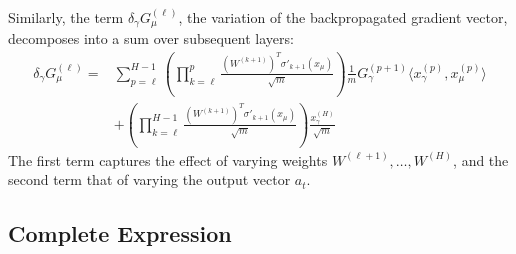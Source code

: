 \documentclass[11pt,a4paper]{article}
\theoremstyle{definition}
\begin{document}
Similarly, the term $\delta_\gamma G^{(\ell)}_\mu$, the variation of the backpropagated gradient vector, decomposes into a sum over subsequent layers:
\begin{align}
\delta_\gamma G^{(\ell)}_\mu = & \sum_{p=\ell}^{H-1} \left( \prod_{k=\ell}^{p} \frac{(W^{(k+1)})^T \sigma'_{k+1}(x_\mu)}{\sqrt{m}} \right) \frac{1}{m} G^{(p+1)}_\gamma \langle x^{(p)}_\gamma, x^{(p)}_\mu \rangle \\
& + \left( \prod_{k=\ell}^{H-1} \frac{(W^{(k+1)})^T \sigma'_{k+1}(x_\mu)}{\sqrt{m}} \right) \frac{x^{(H)}_\gamma}{\sqrt{m}}
\end{align}
The first term captures the effect of varying weights $W^{(\ell+1)}, \dots, W^{(H)}$, and the second term that of varying the output vector $a_t$.

\subsection{Complete Expression}
\end{document}
